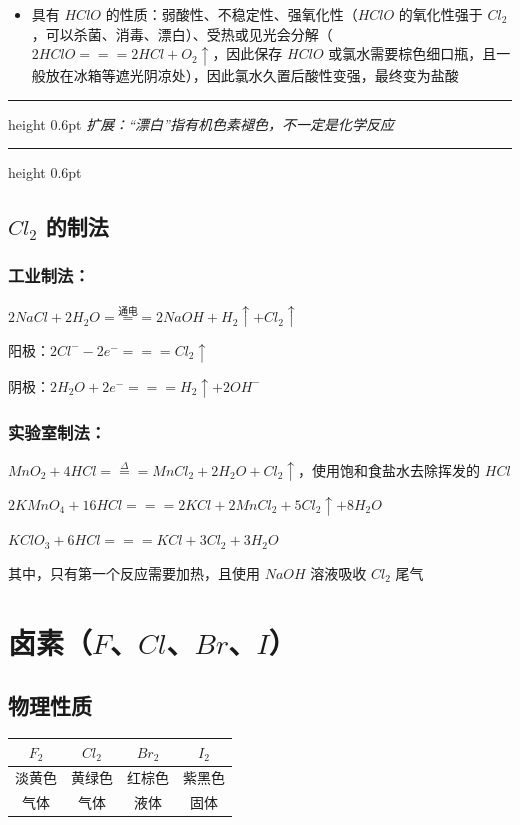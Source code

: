 \documentclass[UTF8,zihao=-4,openany]{ctexbook}
\newenvironment{notebox}
  {\par\smallskip\noindent\begingroup\begin{minipage}{\linewidth}\color{noteframe}\hrule height 0.6pt\smallskip\color{black}\itshape}
  {\par\smallskip\color{noteframe}\hrule height 0.6pt\end{minipage}\endgroup\par\smallskip}
\begin{document}
\begin{itemize}
\item 具有 $HClO$ 的性质：弱酸性、不稳定性、强氧化性（$HClO$ 的氧化性强于 $Cl_2$，可以杀菌、消毒、漂白）、受热或见光会分解（$2HClO=\!=\!=2HCl+O_2\uparrow$，因此保存 $HClO$ 或氯水需要棕色细口瓶，且一般放在冰箱等遮光阴凉处），因此氯水久置后酸性变强，最终变为盐酸
\end{itemize}
\begin{notebox}
扩展：“漂白”指有机色素褪色，不一定是化学反应\par
\end{notebox}
\subsection{$Cl_2$ 的制法}
\subsubsection{工业制法：}
$2NaCl+2H_2O\stackrel{\mbox{通电}}{=\!=\!=}2NaOH+H_2\uparrow+Cl_2\uparrow$\par

阳极：$2Cl^--2e^-=\!=\!=Cl_2\uparrow$\par

阴极：$2H_2O+2e^-=\!=\!=H_2\uparrow+2OH^-$\par
\subsubsection{实验室制法：}
$MnO_2+4HCl\stackrel{\Delta}{=\!=\!=}MnCl_2+2H_2O+Cl_2\uparrow$，使用饱和食盐水去除挥发的 $HCl$\par

$2KMnO_4+16HCl=\!=\!=2KCl+2MnCl_2+5Cl_2\uparrow+8H_2O$\par

$KClO_3+6HCl=\!=\!=KCl+3Cl_2+3H_2O$\par

其中，只有第一个反应需要加热，且使用 $NaOH$ 溶液吸收 $Cl_2$ 尾气\par
\section{卤素（$F$、$Cl$、$Br$、$I$）}
\subsection{物理性质}
\begin{table}[H]
\centering
\small
\renewcommand{\arraystretch}{1.12}
\begin{tabular}{c c c c}
\toprule
$F_2$ & $Cl_2$ & $Br_2$ & $I_2$ \\
\midrule
淡黄色 & 黄绿色 & 红棕色 & 紫黑色 \\
气体 & 气体 & 液体 & 固体 \\
\bottomrule
\end{tabular}
\end{table}
\end{document}
